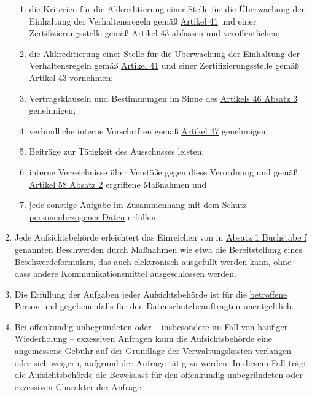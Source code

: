 \begin{enumerate}
\begin{enumerate}
    \item die Kriterien für die Akkreditierung einer Stelle für die Überwachung der Einhaltung der Verhaltensregeln
     gemäß \hyperref[ch:41]{Artikel 41} und einer Zertifizierungsstelle gemäß \hyperref[ch:43]{Artikel 43} abfassen und
     veröffentlichen;
    \label{itm:57-1p}

    \item die Akkreditierung einer Stelle für die Überwachung der Einhaltung der Verhaltensregeln gemäß \hyperref[ch:41]
     {Artikel 41} und einer Zertifizierungsstelle gemäß \hyperref[ch:43]{Artikel 43} vornehmen;
    \label{itm:57-1q}

    \item Vertragsklauseln und Bestimmungen im Sinne des \hyperref[itm:46-3]{Artikels 46 Absatz 3} genehmigen;
    \label{itm:57-1r}

    \item verbindliche interne Vorschriften gemäß \hyperref[ch:47]{Artikel 47} genehmigen;
    \label{itm:57-1s}

    \item Beiträge zur Tätigkeit des Ausschusses leisten;
    \label{itm:57-1t}

    \item interne Verzeichnisse über Verstöße gegen diese Verordnung und gemäß \hyperref[itm:58-2]{Artikel 58 Absatz 2}
     ergriffene Maßnahmen und
    \label{itm:57-1u}

    \item jede sonstige Aufgabe im Zusammenhang mit dem Schutz \hyperref[itm:04-1]{personenbezogener Daten} erfüllen.
    \label{itm:57-1v}

  \end{enumerate}

  \item Jede Aufsichtsbehörde erleichtert das Einreichen von in \hyperref[itm:57-1f]{Absatz 1 Buchstabe f} genannten
   Beschwerden durch Maßnahmen wie etwa die Bereitstellung eines Beschwerdeformulars, das auch elektronisch ausgefüllt
   werden kann, ohne dass andere Kommunikationsmittel ausgeschlossen werden.
  \label{itm:57-2}

  \item Die Erfüllung der Aufgaben jeder Aufsichtsbehörde ist für die \hyperref[itm:04-1]{betroffene Person} und gegebenenfalls für den
   Datenschutzbeauftragten unentgeltlich.
  \label{itm:57-3}

  \item Bei offenkundig unbegründeten oder -- insbesondere im Fall von häufiger Wiederholung -- exzessiven Anfragen kann
   die Aufsichtsbehörde eine angemessene Gebühr auf der Grundlage der Verwaltungskosten verlangen oder sich weigern,
   aufgrund der Anfrage tätig zu werden. In diesem Fall trägt die Aufsichtsbehörde die Beweislast für den offenkundig
   unbegründeten oder exzessiven Charakter der Anfrage.
  \label{itm:57-4}

\end{enumerate}


